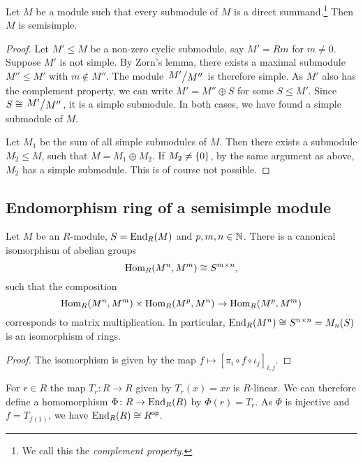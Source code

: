 \begin{trditev}
Let $M$ be a module such that every submodule of $M$ is a direct
summand.\footnote{We call this the \emph{complement property}.}
Then $M$ is semisimple.
\end{trditev}

\begin{proof}
Let $M' \leq M$ be a non-zero cyclic submodule, say $M' = Rm$ for
$m \ne 0$. Suppose $M'$ is not simple. By Zorn's lemma, there
exists a maximal submodule $M'' \leq M'$ with $m \not \in M''$. The
module $\kvoc{M'}{M''}$ is therefore simple. As $M'$ also has the
complement property, we can write $M' = M'' \oplus S$ for some
$S \leq M'$. Since $S \cong \kvoc{M'}{M''}$, it is a simple
submodule. In both cases, we have found a simple submodule of $M$.

Let $M_1$ be the sum of all simple submodules of $M$. Then there
exists a submodule $M_2 \leq M$, such that $M = M_1 \oplus M_2$.
If $M_2 \ne \left\{0\right\}$, by the same argument as above, $M_2$ has a
simple submodule. This is of course not possible.
\end{proof}

\newpage

\subsection{Endomorphism ring of a semisimple module}

\begin{trditev}
Let $M$ be an $R$-module, $S = \operatorname{End}_R(M)$ and $p, m, n \in \mathbb{N}$.
There is a canonical isomorphism of abelian groups
\[
\operatorname{Hom}_R(M^n, M^m) \cong S^{m \times n},
\]
such that the composition
\[
\operatorname{Hom}_R(M^n, M^m) \times \operatorname{Hom}_R(M^p, M^n) \to \operatorname{Hom}_R(M^p, M^m)
\]
corresponds to matrix multiplication. In particular,
$\operatorname{End}_R(M^n) \cong S^{n \times n} = M_n(S)$ is an isomorphism of
rings.
\end{trditev}

\begin{proof}
The isomorphism is given by the map
$f \mapsto [\pi_i \circ f \circ \iota_j]_{i,j}$.
\end{proof}

\begin{opomba}
For $r \in R$ the map $T_r \colon R \to R$ given by $T_r(x) = xr$
is $R$-linear. We can therefore define a homomorphism
$\Phi \colon R \to \operatorname{End}_R(R)$ by $\Phi(r) = T_r$. As
$\Phi$ is injective and $f = T_{f(1)}$, we have
$\operatorname{End}_R(R) \cong R^{\mathsf{op}}$.
\end{opomba}

